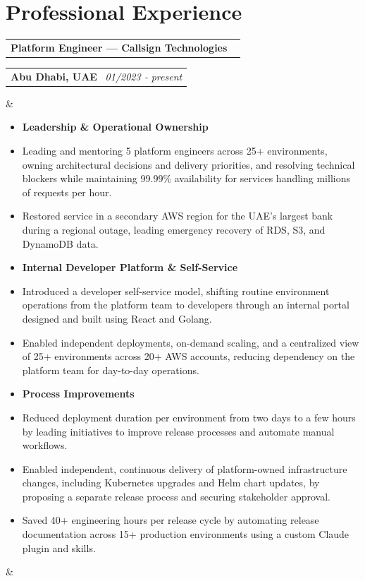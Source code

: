 \documentclass[11pt,a4paper,sans]{moderncv}
\makeatletter
\newcommand*{\customcventry}[7][.13em]{
\begin{tabular}{@{}l}
{\bfseries #4} \
{\itshape #3}
\end{tabular}
\hfill
\begin{tabular}{l@{}}
{\bfseries #5} \
{\itshape #2}
\end{tabular}
\ifx&#7&%
\else{%
\small#7}\fi%
\par\addvspace{#1}}
\makeatother
\begin{document}
\section{Professional Experience}
\customcventry{01/2023 ‐ present}{}{Platform Engineer — Callsign Technologies}{Abu Dhabi, UAE}{}{
{\begin{itemize}[leftmargin=1cm,topsep=4pt, itemsep=0pt, parsep=0pt, label={\textbullet}]
    \item[] \hspace*{-0.4cm}\textbf{Leadership \& Operational Ownership}\nopagebreak
    \item Leading and mentoring 5 platform engineers across 25+ environments, owning architectural decisions and delivery priorities, and resolving technical blockers while maintaining 99.99\% availability for services handling millions of requests per hour.
    \item Restored service in a secondary AWS region for the UAE's largest bank during a regional outage, leading emergency recovery of RDS, S3, and DynamoDB data.
    \item[] \hspace*{-0.4cm}\textbf{Internal Developer Platform \& Self-Service}\nopagebreak
    \item Introduced a developer self-service model, shifting routine environment operations from the platform team to developers through an internal portal designed and built using React and Golang.
    \item Enabled independent deployments, on-demand scaling, and a centralized view of 25+ environments across 20+ AWS accounts, reducing dependency on the platform team for day-to-day operations.
    \item[] \hspace*{-0.4cm}\textbf{Process Improvements}\nopagebreak
    \item Reduced deployment duration per environment from two days to a few hours by leading initiatives to improve release processes and automate manual workflows.
    \item Enabled independent, continuous delivery of platform-owned infrastructure changes, including Kubernetes upgrades and Helm chart updates, by proposing a separate release process and securing stakeholder approval.
    \item Saved 40+ engineering hours per release cycle by automating release documentation across 15+ production environments using a custom Claude plugin and skills.

\end{itemize}}}
\end{document}
